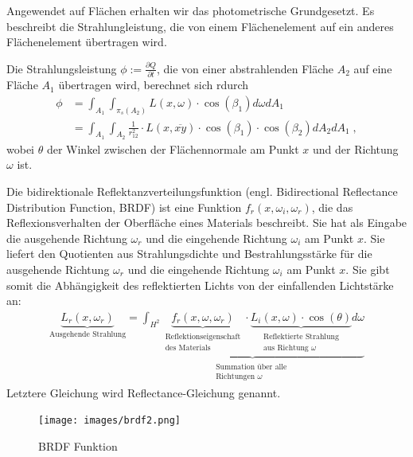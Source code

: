 Angewendet  auf Flächen erhalten wir das  photometrische Grundgesetzt. Es beschreibt die Strahlungleistung, die von einem  Flächenelement auf ein anderes  Flächenelement übertragen wird.
\begin{figure}[H]\centering
    \hspace*{0.1\textwidth}
   \end{figure}


\begin{Satz}
Die Strahlungsleistung $\phi:= \frac{ \partial Q}{\partial t}$, die von einer abstrahlenden Fläche $A_2$  auf eine Fläche $A_1$ übertragen wird, berechnet sich rdurch
\begin{align}
\phi &= \int_{A_1} \int_{\pi_s(A_2)} L(x, \omega)\cdot \cos(\beta_1) d\omega  dA_1  \\
&= \int_{A_1} \int_{A_2} \frac{1}{r_{12}^2}  \cdot L(x, \overline{xy}) \cdot \cos(\beta_1) \cdot \cos(\beta_2)  d A_2 dA_1 \; ,
\end{align}
wobei $\theta$ der Winkel zwischen der Flächennormale am Punkt $x$ und der Richtung $\omega$ ist.
\end{Satz}

\begin{Definition}
Die  bidirektionale Reflektanzverteilungsfunktion (engl. Bidirectional Reflectance Distribution Function, BRDF)
ist eine Funktion $f_r (x, \omega_i, \omega_r)$, die das Reflexionsverhalten der Oberfläche eines Materials beschreibt. 
Sie hat als Eingabe die ausgehende Richtung $\omega_r$ und die eingehende Richtung  $\omega_i$ am Punkt $x$. 
Sie  liefert den Quotienten aus Strahlungsdichte und Bestrahlungsstärke für die ausgehende Richtung $\omega_r$ und die eingehende Richtung  $\omega_i$ am Punkt $x$.
Sie gibt somit die Abhängigkeit des reflektierten Lichts von der einfallenden Lichtstärke an: 
\begin{align}
\underbrace{L_r(x, \omega_r)}_{\text{Ausgehende Strahlung}} =\underbrace{\int_{H^2} \underbrace{f_r (x, \omega, \omega_r)}_{\substack{\text{Reflektionseigenschaft} \\ \text{des Materials}}} \cdot  \underbrace{L_i(x, \omega) \cdot  \cos(\theta) }_{\substack{\text{Reflektierte Strahlung} \\ \text{aus Richtung $\omega$}}} d\omega}_{\substack{\text{Summation über alle } \\ \text{Richtungen $\omega$}}} 
\end{align}
Letztere Gleichung wird  Reflectance-Gleichung genannt.
\end{Definition}
 \begin{figure}[H]
    \centering
    \texttt{[image: images/brdf2.png]}
    \caption{BRDF Funktion}
    \label{fig:raytracin_brdf}
\end{figure}


